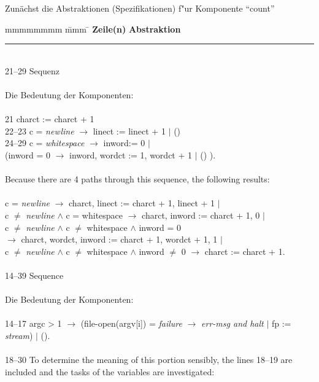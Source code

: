 Zun\"achst die Abstraktionen (Spezifikationen) f"ur Komponente "`count"'

\begin{tabbing}
mmmmmmmm   \= mmm \= \kill
{\bf Zeile(n)} \> {\bf Abstraktion}							\\
\rule{\textwidth}{.5pt}\\ 
21--29	\> Sequenz									\\
											\\
	\>Die Bedeutung der Komponenten:						\\
											\\
21	\> charct := charct + 1								\\
22--23  \> c = {\em newline} $\rightarrow$ linect := linect + 1 $\mid$ ()  		\\
24--29	\> c = {\em whitespace} $\rightarrow$ inword:= 0 $\mid$ 				\\
	\> \>	(inword = 0 $\rightarrow$ inword, wordct := 1, wordct + 1 $\mid$ () ).	\\
											\\
	\> Because there are 4 paths through this sequence, the following results:	\\
											\\
	\> c = {\em newline} $\rightarrow$ charct, linect := charct + 1, linect + 1 $\mid$	\\
	\> c $\not=$ {\em newline} $\wedge$ c = whitespace $\rightarrow$ charct, inword := charct + 1, 0 $\mid$\\
	\> c $\not=$ {\em newline} $\wedge$ c $\not=$ whitespace $\wedge$ inword = 0 		\\
	\> \>	$\rightarrow$ charct, wordct, inword := charct + 1, wordct + 1, 1 $\mid$\\
	\> c $\not=$ {\em newline} $\wedge$ c $\not=$ whitespace $\wedge$ inword $\not=$ 0 $\rightarrow$ charct := charct + 1.\\
\\
14--39	\> Sequence\\
\\
	Die Bedeutung der Komponenten:\\
\\
14--17	\>argc > 1 $\rightarrow$ (file-open(argv[i]) = {\em failure} $\rightarrow$ {\em err-msg and halt} $\mid$ fp := {\em stream}) $\mid$ ().\\
\\
18--30	\> To determine the meaning of this portion sensibly, the lines 18--19 are \\
	\> included and the tasks of the variables are investigated:\\

\end{tabbing}
